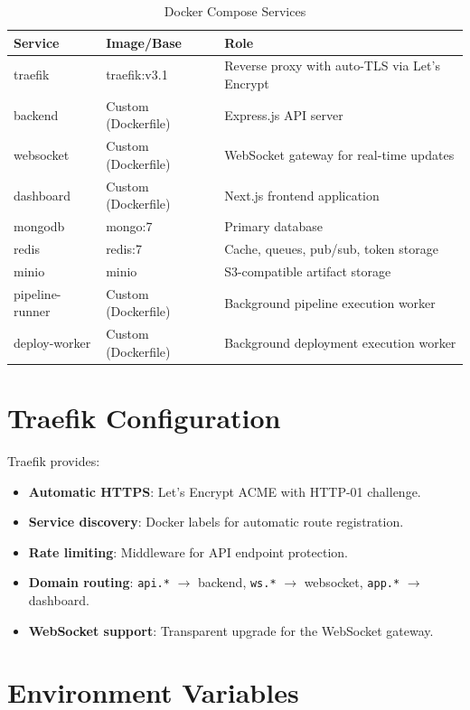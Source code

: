 \documentclass[12pt,a4paper,twoside]{report}
\begin{document}
\begin{table}[H]
\centering
\caption{Docker Compose Services}
\label{tab:docker-services}
\begin{tabularx}{\textwidth}{l|l|X}
\toprule
\textbf{Service} & \textbf{Image/Base} & \textbf{Role} \\
\midrule
traefik & traefik:v3.1 & Reverse proxy with auto-TLS via Let's Encrypt \\
backend & Custom (Dockerfile) & Express.js API server \\
websocket & Custom (Dockerfile) & WebSocket gateway for real-time updates \\
dashboard & Custom (Dockerfile) & Next.js frontend application \\
mongodb & mongo:7 & Primary database \\
redis & redis:7 & Cache, queues, pub/sub, token storage \\
minio & minio & S3-compatible artifact storage \\
pipeline-runner & Custom (Dockerfile) & Background pipeline execution worker \\
deploy-worker & Custom (Dockerfile) & Background deployment execution worker \\
\bottomrule
\end{tabularx}
\end{table}

\section{Traefik Configuration}

Traefik provides:
\begin{itemize}[noitemsep]
  \item \textbf{Automatic HTTPS}: Let's Encrypt ACME with HTTP-01 challenge.
  \item \textbf{Service discovery}: Docker labels for automatic route registration.
  \item \textbf{Rate limiting}: Middleware for API endpoint protection.
  \item \textbf{Domain routing}: \texttt{api.*} $\rightarrow$ backend, \texttt{ws.*} $\rightarrow$ websocket, \texttt{app.*} $\rightarrow$ dashboard.
  \item \textbf{WebSocket support}: Transparent upgrade for the WebSocket gateway.
\end{itemize}

\section{Environment Variables}
\end{document}

